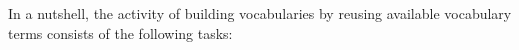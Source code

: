 In a nutshell, the activity of building vocabularies by reusing available vocabulary terms consists of the following tasks:

